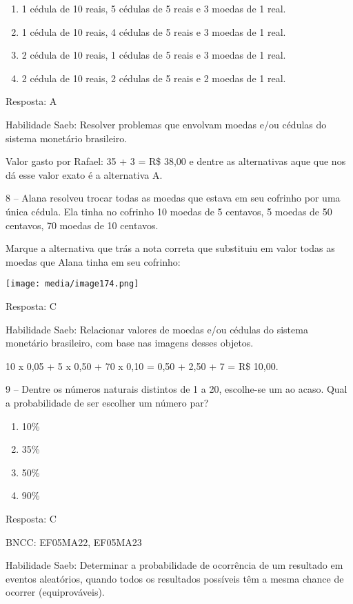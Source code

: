 \begin{enumerate}
\def\labelenumi{\alph{enumi})}
\item
  1 cédula de 10 reais, 5 cédulas de 5 reais e 3 moedas de 1 real.
\item
  1 cédula de 10 reais, 4 cédulas de 5 reais e 3 moedas de 1 real.
\item
  2 cédula de 10 reais, 1 cédulas de 5 reais e 3 moedas de 1 real.
\item
  2 cédula de 10 reais, 2 cédulas de 5 reais e 2 moedas de 1 real.
\end{enumerate}

Resposta: A

Habilidade Saeb: Resolver problemas que envolvam moedas e/ou cédulas do
sistema monetário brasileiro.

Valor gasto por Rafael: 35 + 3 = R\$ 38,00 e dentre as alternativas aque
que nos dá esse valor exato é a alternativa A.

8 -- Alana resolveu trocar todas as moedas que estava em seu cofrinho
por uma única cédula. Ela tinha no cofrinho 10 moedas de 5 centavos, 5
moedas de 50 centavos, 70 moedas de 10 centavos.

Marque a alternativa que trás a nota correta que substituiu em valor
todas as moedas que Alana tinha em seu cofrinho:

\texttt{[image: media/image174.png]}

Resposta: C

Habilidade Saeb: Relacionar valores de moedas e/ou cédulas do sistema
monetário brasileiro, com base nas imagens desses objetos.

10 x 0,05 + 5 x 0,50 + 70 x 0,10 = 0,50 + 2,50 + 7 = R\$ 10,00.

9 -- Dentre os números naturais distintos de 1 a 20, escolhe-se um ao
acaso. Qual a probabilidade de ser escolher um número par?

\begin{enumerate}
\def\labelenumi{\alph{enumi})}
\item
  10\%
\item
  35\%
\item
  50\%
\item
  90\%
\end{enumerate}

Resposta: C

BNCC: EF05MA22, EF05MA23

Habilidade Saeb: Determinar a probabilidade de ocorrência de um
resultado em eventos aleatórios, quando todos os resultados possíveis
têm a mesma chance de ocorrer (equiprováveis).

